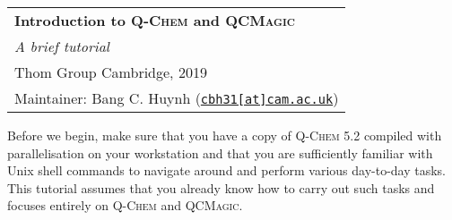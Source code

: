 \documentclass[%
	11pt,%
	oneside,%
	DIV=15,%
	BCOR=0mm,%
	headinclude=true,%
	footinclude=true,%
	parskip=half,%
	headsepline
]{scrartcl}
\begin{document}
	\vspace{1cm}
	\noindent
	\bgroup
	\renewcommand\arraystretch{1.5} \begin{tabular*}{\linewidth}{>{\centering\arraybackslash}m{\linewidth}}
		\hline
		\textbf{\Large Introduction to \textsc{Q-Chem} and \textsc{QCMagic}}\\
		\textit{\large A brief tutorial}\\
		\textcopyright Thom Group Cambridge, 2019\\[-8pt]
		Maintainer: Bang C. Huynh (\href{mailto:cbh31@cam.ac.uk}{\texttt{cbh31[at]cam.ac.uk}})\\
		\hline
	\end{tabular*}
	\egroup
	
	\tableofcontents
	
	
	Before we begin, make sure that you have a copy of \textsc{Q-Chem} 5.2 compiled with parallelisation on your workstation and that you are sufficiently familiar with Unix shell commands to navigate around and perform various day-to-day tasks.
	This tutorial assumes that you already know how to carry out such tasks and focuses entirely on \textsc{Q-Chem} and \textsc{QCMagic}.
	
	\clearpage
	
	
\end{document}
